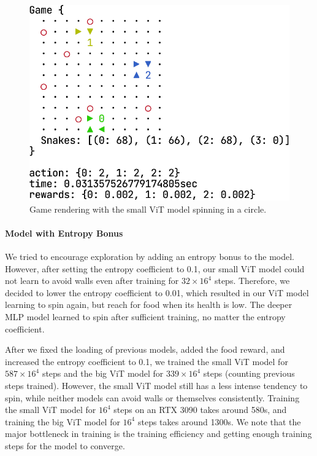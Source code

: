 \documentclass[conference]{IEEEtran}
\begin{document}
\begin{figure}
    \centering
    \includegraphics[width=\linewidth]{vit_spin_render.png}
    \caption{Game rendering with the small ViT model spinning in a circle.
    }
    \label{fig:render}
\end{figure}

\paragraph{Model with Entropy Bonus}
We tried to encourage exploration by adding an entropy bonus to the model.
However, after setting the entropy coefficient to 0.1,
our small ViT model could not learn to avoid walls even after training for
$32\times 16^4$ steps. Therefore,
we decided to lower the entropy coefficient to 0.01,
which resulted in our ViT model learning to spin again,
but reach for food when its health is low.
The deeper MLP model learned to spin after sufficient training,
no matter the entropy coefficient.

After we fixed the loading of previous models, added the food reward,
and increased the entropy coefficient to 0.1,
we trained the small ViT model for $587\times 16^4$ steps and the big ViT model
for $339\times 16^4$ steps (counting previous steps trained). However,
the small ViT model still has a less intense tendency to spin,
while neither models can avoid walls or themselves consistently.
Training the small ViT model for $16^4$ steps on an RTX 3090 takes around 580s,
and training the big ViT model for $16^4$ steps takes around 1300s.
We note that the major bottleneck in training is the training efficiency and
getting enough training steps for the model to converge.
\end{document}
